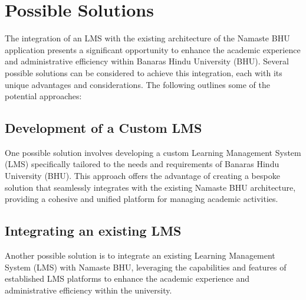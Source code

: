 \section{Possible Solutions}
The integration of an LMS with the existing architecture of the Namaste BHU application presents a significant opportunity to enhance the academic experience and administrative efficiency within Banaras Hindu University (BHU). Several possible solutions can be considered to achieve this integration, each with its unique advantages and considerations. The following outlines some of the potential approaches:

\subsection{Development of a Custom LMS}
One possible solution involves developing a custom Learning Management System (LMS) specifically tailored to the needs and requirements of Banaras Hindu University (BHU). This approach offers the advantage of creating a bespoke solution that seamlessly integrates with the existing Namaste BHU architecture, providing a cohesive and unified platform for managing academic activities.

\subsection{Integrating an existing LMS}
Another possible solution is to integrate an existing Learning Management System (LMS) with Namaste BHU, leveraging the capabilities and features of established LMS platforms to enhance the academic experience and administrative efficiency within the university.

